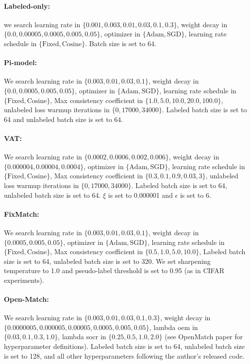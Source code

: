 \paragraph{Labeled-only:} we search learning rate in $\{0.001, 0.003, 0.01, 0.03, 0.1, 0.3\}$, weight decay in $\{0.0, 0.00005, 0.0005, 0.005, 0.05\}$, optimizer in $\{\text{Adam}, \text{SGD}\}$, learning rate schedule in $\{\text{Fixed}, \text{Cosine}\}$. Batch size is set to 64.

\paragraph{Pi-model:} 
We search learning rate in $\{0.003, 0.01, 0.03, 0.1\}$, weight decay in $\{0.0, 0.0005, 0.005, 0.05\}$, optimizer in $\{\text{Adam}, \text{SGD}\}$, 
learning rate schedule in $\{\text{Fixed}, \text{Cosine}\}$, Max consistency coefficient in $\{1.0, 5.0, 10.0, 20.0, 100.0\}$, unlabeled loss warmup iterations in $\{0, 17000, 34000\}$. Labeled batch size is set to 64 and unlabeled batch size is set to 64.

\paragraph{VAT:} 
We search learning rate in $\{0.0002, 0.0006, 0.002, 0.006\}$, weight decay in $\{0.000004, 0.00004, 0.0004\}$, optimizer in $\{\text{Adam}, \text{SGD}\}$, 
learning rate schedule in $\{\text{Fixed}, \text{Cosine}\}$, Max consistency coefficient in $\{0.3, 0.1, 0.9, 0.03, 3\}$,  unlabeled loss warmup iterations in $\{0, 17000, 34000\}$. Labeled batch size is set to 64, unlabeled batch size is set to 64. $\xi$ is set to 0.000001 and $\epsilon$ is set to 6.

\paragraph{FixMatch:} 
We search learning rate in $\{0.003, 0.01, 0.03, 0.1\}$, weight decay in $\{0.0005, 0.005, 0.05\}$, optimizer in $\{\text{Adam}, \text{SGD}\}$, 
learning rate schedule in $\{\text{Fixed}, \text{Cosine}\}$, Max consistency coefficient in $\{0.5, 1.0, 5.0, 10.0\}$, Labeled batch size is set to 64, unlabeled batch size is set to 320. We set sharpening temperature to 1.0 and pseudo-label threshold is set to 0.95 (as in CIFAR experiments).

\paragraph{Open-Match:} 
We search learning rate in $\{0.003, 0.01, 0.03, 0.1, 0.3\}$, weight decay in $\{0.0000005, 0.000005, 0.00005, 0.0005, 0.005, 0.05\}$, 
lambda oem in $\{0.03, 0.1, 0.3, 1.0\}$, lambda socr in $\{0.25, 0.5, 1.0, 2.0\}$ (see OpenMatch paper for hyperparameter definitions). Labeled batch size is set to 64, unlabeled batch size is set to 128, and all other hyperparameters following the author's released code.

